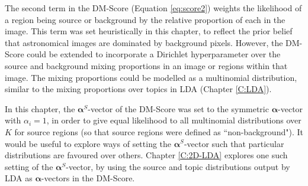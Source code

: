 The second term in the DM-Score (Equation \ref{eq:score2}) weights the likelihood of a region being source or background by the relative proportion of each in the image. This term was set heuristically in this chapter, to reflect the prior belief that astronomical images are dominated by background pixels. However, the DM-Score could be extended to incorporate a Dirichlet hyperparameter over the source and background mixing proportions in an image or regions within that image. The mixing proportions could be modelled as a multinomial distribution, similar to the mixing proportions over topics in LDA (Chapter \ref{C:LDA}).

In this chapter, the $\boldsymbol{\alpha}^S$-vector of the DM-Score was set to the symmetric $\boldsymbol{\alpha}$-vector with $\alpha_i = 1$, in order to give equal likelihood to all multinomial distributions over $K$ for source regions (so that source regions were defined as ``non-background"). It would be useful to explore ways of setting the $\boldsymbol{\alpha}^S$-vector such that particular distributions are favoured over others. Chapter \ref{C:2D-LDA} explores one such setting of the $\boldsymbol{\alpha}^S$-vector, by using the source and topic distributions output by LDA as $\boldsymbol{\alpha}$-vectors in the DM-Score.



